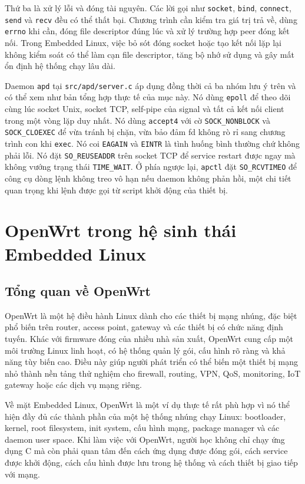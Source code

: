 \documentclass[11pt]{article}
\newcommand{\code}[1]{\texttt{#1}}
\begin{document}
Thứ ba là xử lý lỗi và đóng tài nguyên. Các lời gọi như \code{socket}, \code{bind}, \code{connect}, \code{send} và \code{recv} đều có thể thất bại. Chương trình cần kiểm tra giá trị trả về, dùng \code{errno} khi cần, đóng file descriptor đúng lúc và xử lý trường hợp peer đóng kết nối. Trong Embedded Linux, việc bỏ sót đóng socket hoặc tạo kết nối lặp lại không kiểm soát có thể làm cạn file descriptor, tăng bộ nhớ sử dụng và gây mất ổn định hệ thống chạy lâu dài.

Daemon \code{apd} tại \code{src/apd/server.c} áp dụng đồng thời cả ba nhóm lưu ý trên và có thể xem như bản tổng hợp thực tế của mục này. Nó dùng \code{epoll} để theo dõi cùng lúc socket Unix, socket TCP, self-pipe của signal và tất cả kết nối client trong một vòng lặp duy nhất. Nó dùng \code{accept4} với cờ \code{SOCK\_NONBLOCK} và \code{SOCK\_CLOEXEC} để vừa tránh bị chặn, vừa bảo đảm fd không rò rỉ sang chương trình con khi \code{exec}. Nó coi \code{EAGAIN} và \code{EINTR} là tình huống bình thường chứ không phải lỗi. Nó đặt \code{SO\_REUSEADDR} trên socket TCP để service restart được ngay mà không vướng trạng thái \code{TIME\_WAIT}. Ở phía ngược lại, \code{apctl} đặt \code{SO\_RCVTIMEO} để công cụ dòng lệnh không treo vô hạn nếu daemon không phản hồi, một chi tiết quan trọng khi lệnh được gọi từ script khởi động của thiết bị.

\section{OpenWrt trong hệ sinh thái Embedded Linux}

\subsection{Tổng quan về OpenWrt}

OpenWrt là một hệ điều hành Linux dành cho các thiết bị mạng nhúng, đặc biệt phổ biến trên router, access point, gateway và các thiết bị có chức năng định tuyến. Khác với firmware đóng của nhiều nhà sản xuất, OpenWrt cung cấp một môi trường Linux linh hoạt, có hệ thống quản lý gói, cấu hình rõ ràng và khả năng tùy biến cao. Điều này giúp người phát triển có thể biến một thiết bị mạng nhỏ thành nền tảng thử nghiệm cho firewall, routing, VPN, QoS, monitoring, IoT gateway hoặc các dịch vụ mạng riêng.

Về mặt Embedded Linux, OpenWrt là một ví dụ thực tế rất phù hợp vì nó thể hiện đầy đủ các thành phần của một hệ thống nhúng chạy Linux: bootloader, kernel, root filesystem, init system, cấu hình mạng, package manager và các daemon user space. Khi làm việc với OpenWrt, người học không chỉ chạy ứng dụng C mà còn phải quan tâm đến cách ứng dụng được đóng gói, cách service được khởi động, cách cấu hình được lưu trong hệ thống và cách thiết bị giao tiếp với mạng.
\end{document}
